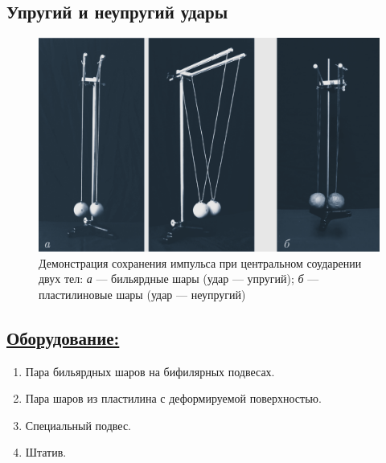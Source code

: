\documentclass[14pt,a4paper,oneside]{extarticle}	%
\begin{document}
	
	
	\begin{center}
		\subsection*{Упругий и неупругий удары}
	\end{center}
	
	\begin{figure}[H] 	%
		\centering 	
		\includegraphics[width=0.9\linewidth]{hit-1.png}
		\caption{Демонстрация сохранения импульса при центральном соударении двух тел: \textit{а} — бильярдные шары (удар — упругий); \textit{б} — пластилиновые шары (удар — неупругий)}
		\label{hit-1}
	\end{figure}
	
	\subsection*{\underline{Оборудование:}}
	
	\begin{enumerate} 
		\item Пара бильярдных шаров на бифилярных подвесах.
		\item Пара шаров из пластилина с деформируемой поверхностью.
		\item Специальный подвес.
		\item Штатив.
	\end{enumerate}
\end{document}

